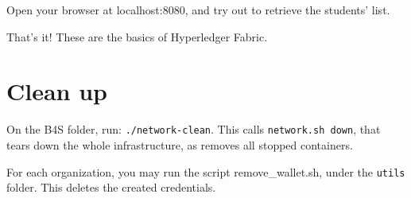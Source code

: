 \documentclass[12pt,a4paper]{article}
\theoremstyle{definition}
\begin{document}
Open your browser at localhost:8080, and try out to retrieve the students' list.

That's it! These are the basics of Hyperledger Fabric.




\section{Clean up}
On the B4S folder, run: \texttt{./network-clean}. This calls \texttt{network.sh down}, that tears down the whole infrastructure, as removes all stopped containers.

For each organization, you may run the script remove\_wallet.sh, under the \texttt{utils} folder. This deletes the created credentials.









\end{document}
